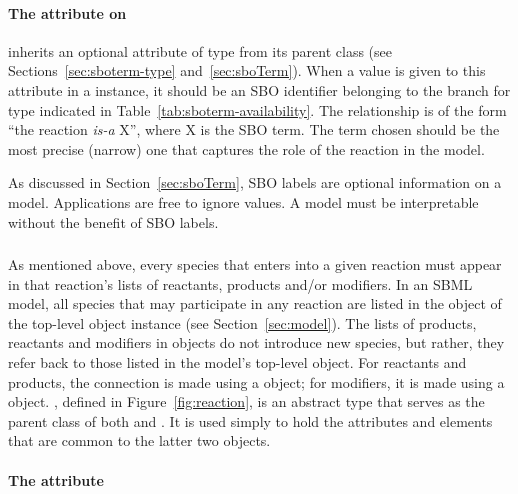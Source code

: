 \paragraph{The  attribute on }
\label{sec:reaction-sboterm}

\Reaction inherits an optional 
attribute of type  from its parent
class \SBase (see Sections~\ref{sec:sboterm-type}
and~\ref{sec:sboTerm}).  When a value is given to this
attribute in a  \Reaction instance, it should be an
SBO identifier belonging to the branch for type  \Reaction  
indicated in Table~\ref{tab:sboterm-availability}.  The relationship is
of the form ``the reaction \emph{is-a} X'', where X is
the SBO term.  The term chosen should be the most precise (narrow)
one that captures the role of the reaction in the model.

As discussed in Section~\ref{sec:sboTerm}, SBO labels are optional
information on a model.  Applications are free to ignore
 values.  A model must be interpretable without the
benefit of SBO labels.


\subsubsection{}
\label{subsec:simplespeciesreference}

As mentioned above, every species that enters into a given
reaction must appear in that reaction's lists of reactants,
products and/or modifiers.  In an SBML model, all species that may
participate in any reaction are listed in the \ListOfSpecies
object of the top-level \Model object instance (see
Section~\ref{sec:model}).  The lists of products, reactants and
modifiers in \Reaction objects do not introduce new species, but
rather, they refer back to those listed in the model's top-level
\ListOfSpecies object.  For reactants and products, the connection
is made using a \SpeciesReference object; for modifiers, it is
made using a \ModifierSpeciesReference object.
\SimpleSpeciesReference, defined in Figure~\vref{fig:reaction}, is
an abstract type that serves as the parent class of both
\SpeciesReference and \ModifierSpeciesReference.  It is used
simply to hold the attributes and elements that are common to the
latter two objects.


\paragraph{The  attribute}

